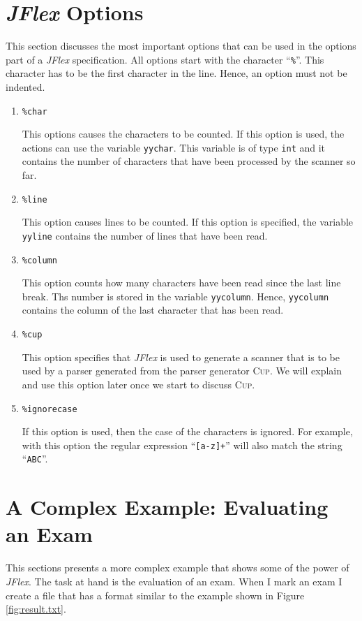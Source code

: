 \section{\textsl{JFlex} Options}
This section discusses the most important options that can be used in the options part of a 
\textsl{JFlex} specification.  All options start with the character ``\texttt{\%}''.
This character has to be the first character in the line.  Hence, an option must not be indented.
\begin{enumerate}
\item \texttt{\%char}

      This options causes the characters to be counted.  If this option is used, the actions can use
      the variable \texttt{yychar}.  This  variable is of type \texttt{int} and it contains the
      number of characters that have been processed by the scanner so far.
\item \texttt{\%line}

      This option causes lines to be counted.  If this option is specified, the
      variable \texttt{yyline} contains the number of lines that have been read.
\item \texttt{\%column}

      This option counts how many characters have been read since the last line break.
      Ths number is stored in the variable \texttt{yycolumn}.  Hence,  \texttt{yycolumn} contains
      the column of the last character that has been read.
\item \texttt{\%cup}

      This option specifies that \textsl{JFlex} is used to generate a scanner that is to be used by
      a parser generated from the  parser generator \textsc{Cup}.  We will explain and use this
      option later once we start to discuss \textsc{Cup}.
\item \texttt{\%ignorecase}

      If this option is used, then the case of the characters is ignored.  For example, with this
      option the regular expression
      ``\texttt{[a-z]+}'' will also match the string ``\texttt{ABC}''.
\end{enumerate}

\section{A Complex Example: Evaluating an Exam}
This sections presents a more complex example that shows some of the power of \textsl{JFlex}.  The
task at hand is the evaluation of an exam.  When I mark an exam I create a file that has a format
similar to the example shown in Figure \ref{fig:result.txt}. 

